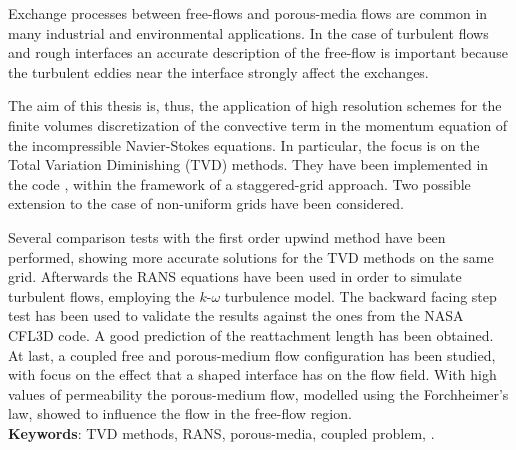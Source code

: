 Exchange processes between free-flows and porous-media flows are common in many 
industrial and environmental applications. In the case of turbulent flows and 
rough interfaces an accurate description of the free-flow is important because 
the turbulent eddies near the interface strongly affect the exchanges.

The aim of this thesis is, thus, the application of high resolution schemes for 
the finite volumes discretization of the convective term in the momentum 
equation of the incompressible Navier-Stokes equations. In particular, the 
focus is on the Total Variation Diminishing (TVD) methods. They have been 
implemented in the code \DUMUX, within the framework of a staggered-grid 
approach. Two possible extension to the case of non-uniform grids have been 
considered.

Several comparison tests with the first order upwind method have been 
performed, showing more accurate solutions for the TVD methods on the same grid.
Afterwards the RANS equations have been used in order to simulate turbulent 
flows, employing the $k\text{-}\omega$ turbulence model. The backward facing 
step test has been used to validate the results against the 
ones from the NASA CFL3D code. A good prediction of the reattachment length has 
been obtained. At last, a coupled free and porous-medium flow configuration has 
been studied, with focus on the effect that a shaped interface has on the flow 
field. With high values of permeability the porous-medium flow, modelled using 
the Forchheimer's law, showed to influence the flow in the free-flow region.
\\[\baselineskip]
\textbf{Keywords}: TVD methods, RANS, porous-media, coupled problem, \DUMUX.